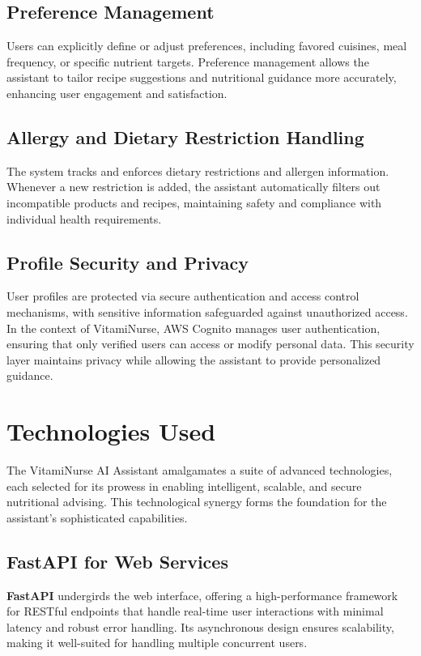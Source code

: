 \subsection{Preference Management}
Users can explicitly define or adjust preferences, including favored cuisines, meal frequency, or specific nutrient targets. Preference management allows the assistant to tailor recipe suggestions and nutritional guidance more accurately, enhancing user engagement and satisfaction.

\subsection{Allergy and Dietary Restriction Handling}
The system tracks and enforces dietary restrictions and allergen information. Whenever a new restriction is added, the assistant automatically filters out incompatible products and recipes, maintaining safety and compliance with individual health requirements.

\subsection{Profile Security and Privacy}
User profiles are protected via secure authentication and access control mechanisms, with sensitive information safeguarded against unauthorized access. In the context of VitamiNurse, AWS Cognito manages user authentication, ensuring that only verified users can access or modify personal data. This security layer maintains privacy while allowing the assistant to provide personalized guidance.


\section{Technologies Used}
The VitamiNurse AI Assistant amalgamates a suite of advanced technologies, each selected for its prowess in enabling intelligent, scalable, and secure nutritional advising. This technological synergy forms the foundation for the assistant's sophisticated capabilities.

\subsection{FastAPI for Web Services}
\textbf{FastAPI} undergirds the web interface, offering a high-performance framework for RESTful endpoints that handle real-time user interactions with minimal latency and robust error handling. Its asynchronous design ensures scalability, making it well-suited for handling multiple concurrent users.

